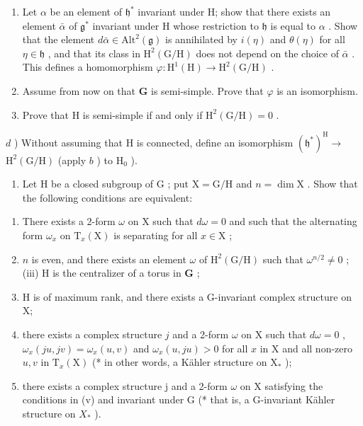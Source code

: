 \begin{enumerate}
\begin{enumerate}
\def\labelenumi{\alph{enumi})}
\item
  Let \(\alpha\) be an element of \(\mathfrak{h}^*\) invariant under H; show that there exists an element \(\bar{\alpha}\) of \(\mathfrak{g}^*\) invariant under H whose restriction to \(\mathfrak{h}\) is equal to \(\alpha\) . Show that the element \(d\bar{\alpha} \in \mathrm{Alt}^2(\mathfrak{g})\) is annihilated by \(i(\eta)\) and \(\theta(\eta)\) for all \(\eta \in \mathfrak{h}\) , and that its class in \(\mathrm{H}^2(\mathrm{G}/\mathrm{H})\) does not depend on the choice of \(\bar{\alpha}\) . This defines a homomorphism \(\varphi: \mathrm{H}^1(\mathrm{H}) \to \mathrm{H}^2(\mathrm{G}/\mathrm{H})\) .
\item
  Assume from now on that \(\mathbf{G}\) is semi-simple. Prove that \(\varphi\) is an isomorphism.
\item
  Prove that \(\mathrm{H}\) is semi-simple if and only if \(\mathrm{H}^2 (\mathrm{G / H}) = 0\) .
\end{enumerate}

\(d\) ) Without assuming that \(\mathrm{H}\) is connected, define an isomorphism \((\mathfrak{h}^{*})^{\mathrm{H}}\to\) \(\mathrm{H}^2 (\mathrm{G / H})\) (apply \(b\) ) to \(\mathrm{H}_0\) ).

\begin{enumerate}
\def\labelenumi{\arabic{enumi})}
\setcounter{enumi}{12}
\tightlist
\item
  Let \(\mathrm{H}\) be a closed subgroup of \(\mathrm{G}\) ; put \(\mathrm{X} = \mathrm{G} / \mathrm{H}\) and \(n = \dim \mathrm{X}\) . Show that the following conditions are equivalent:
\end{enumerate}

\begin{enumerate}
\def\labelenumi{(\roman{enumi})}
\item
  There exists a 2-form \(\omega\) on X such that \(d\omega = 0\) and such that the alternating form \(\omega_{x}\) on \(\mathrm{T}_x(\mathrm{X})\) is separating for all \(x\in \mathrm{X}\) ;
\item
  \(n\) is even, and there exists an element \(\omega\) of \(\mathrm{H}^2 (\mathrm{G / H})\) such that \(\omega^{n / 2}\neq 0\) ; (iii) \(\mathrm{H}\) is the centralizer of a torus in \(\mathbf{G}\) ;
\item
  H is of maximum rank, and there exists a G-invariant complex structure on X;
\item
  there exists a complex structure \(j\) and a 2-form \(\omega\) on X such that \(d\omega = 0\) , \(\omega_{x}(ju,jv) = \omega_{x}(u,v)\) and \(\omega_{x}(u,ju) > 0\) for all \(x\) in X and all non-zero \(u,v\) in \(\mathrm{T}_x(\mathrm{X})\) (* in other words, a Kähler structure on \(\mathrm{X}_{*}\) );
\item
  there exists a complex structure j and a 2-form \(\omega\) on X satisfying the conditions in (v) and invariant under G (* that is, a G-invariant Kähler structure on \(X_{*}\) ).
\end{enumerate}


\end{enumerate}

